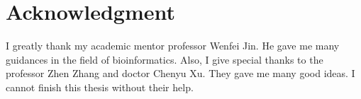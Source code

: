\section{Acknowledgment}
I greatly thank my academic mentor professor Wenfei Jin. He gave me many guidances in the field of bioinformatics. 
Also, I give special thanks to the professor Zhen Zhang and doctor Chenyu Xu. They gave me many good ideas. I cannot finish this thesis without their help.
